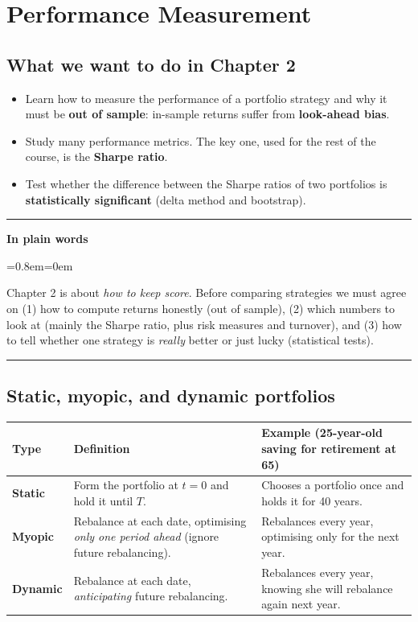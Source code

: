 \documentclass[11pt,a4paper]{report}
\newenvironment{notebox}[1]
  {\par\medskip\Needspace{6\baselineskip}\noindent\rule{\linewidth}{0.4pt}\par\nopagebreak
   \noindent\textbf{#1}\par\nopagebreak
   \begin{list}{}{\leftmargin=0.8em\rightmargin=0em\topsep=2pt}\item[]}
  {\end{list}\nopagebreak\noindent\rule{\linewidth}{0.4pt}\par\medskip}
\newenvironment{plainbox}{\begin{notebox}{In plain words}}{\end{notebox}}
\begin{document}
\chapter{Performance Measurement}
\label{ch:2}

\section{What we want to do in Chapter 2}
\begin{itemize}
  \item Learn how to measure the performance of a portfolio strategy and why it
    must be \textbf{out of sample}: in-sample returns suffer from
    \textbf{look-ahead bias}.
  \item Study many performance metrics. The key one, used for the rest of the
    course, is the \textbf{Sharpe ratio}.
  \item Test whether the difference between the Sharpe ratios of two portfolios
    is \textbf{statistically significant} (delta method and bootstrap).
\end{itemize}

\begin{plainbox}
Chapter 2 is about \emph{how to keep score}. Before comparing strategies we must
agree on (1) how to compute returns honestly (out of sample), (2) which numbers
to look at (mainly the Sharpe ratio, plus risk measures and turnover), and (3)
how to tell whether one strategy is \emph{really} better or just lucky (statistical tests).
\end{plainbox}
\section{Static, myopic, and dynamic portfolios}
\begin{center}
\begin{tabularx}{\textwidth}{@{}lXX@{}}
\toprule
Type & Definition & Example (25-year-old saving for retirement at 65) \\
\midrule
\textbf{Static} & Form the portfolio at $t=0$ and hold it until $T$. & Chooses a portfolio once and holds it for 40 years. \\
\textbf{Myopic} & Rebalance at each date, optimising \emph{only one period ahead} (ignore future rebalancing). & Rebalances every year, optimising only for the next year. \\
\textbf{Dynamic} & Rebalance at each date, \emph{anticipating} future rebalancing. & Rebalances every year, knowing she will rebalance again next year. \\
\bottomrule
\end{tabularx}
\end{center}
\end{document}
